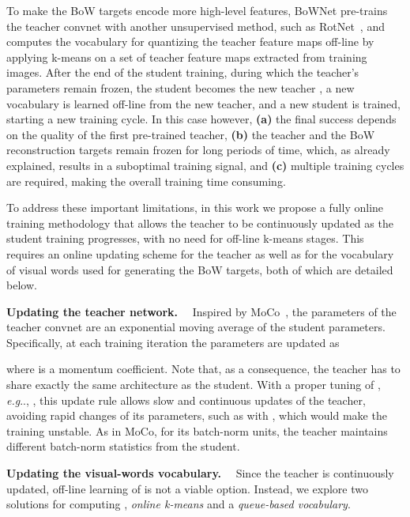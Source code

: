 \documentclass[final]{cvpr}
\makeatletter
\newcommand{\parag}[1]{\smallskip\noindent\textbf{#1}~~}
\DeclareRobustCommand\onedot{\futurelet\@let@token\@onedot}
\def\@onedot{\ifx\@let@token.\else.\null\fi\xspace}
\def\eg{\emph{e.g}\onedot} \def\Eg{\emph{E.g}\onedot}
\makeatother
\begin{document}
To make the BoW targets encode more high-level features, BoWNet pre-trains the teacher convnet  with another unsupervised method, such as RotNet~\cite{gidaris2018unsupervised}, and computes the vocabulary  for quantizing the teacher feature maps off-line by applying k-means on a set of teacher feature maps extracted from training images.
After the end of the student training, during which the teacher's parameters remain frozen, the student becomes the new teacher , a new vocabulary  is learned off-line from the new teacher, and a new student is trained, starting a new training cycle.
In this case however, \textbf{(a)} the final success depends on the quality of the first pre-trained teacher, \textbf{(b)} the teacher and the BoW reconstruction targets  remain frozen for long periods of time, which, as already explained, results in a suboptimal training signal, and \textbf{(c)} multiple training cycles are required, making the overall training time consuming. 

To address these important limitations, in this work we propose a fully online training methodology that allows the teacher to be continuously updated as the student training progresses, with no need for off-line k-means stages.
This requires an online updating scheme for the teacher as well as for the vocabulary of visual words used for generating the BoW targets, both of which are detailed below.

\parag{Updating the teacher network.} 
Inspired by MoCo~\cite{he2020momentum}, the parameters  of the teacher convnet are an exponential moving average of the student parameters. 
Specifically, at each training iteration the parameters  are updated as

where  is a momentum coefficient. 
Note that, as a consequence, the teacher has to share exactly the same architecture as the student.
With a proper tuning of , \eg, , this update rule allows slow and continuous updates of the teacher, avoiding rapid changes of its parameters, such as with ,
which would make the training unstable. 
As in MoCo, for its batch-norm units, the teacher maintains different batch-norm statistics from the student. 

\parag{Updating the visual-words vocabulary.} 
Since the teacher is continuously updated, off-line learning of  is not a viable option. 
Instead, we explore two solutions for computing , \emph{online k-means} and a \emph{queue-based vocabulary}.
\end{document}
